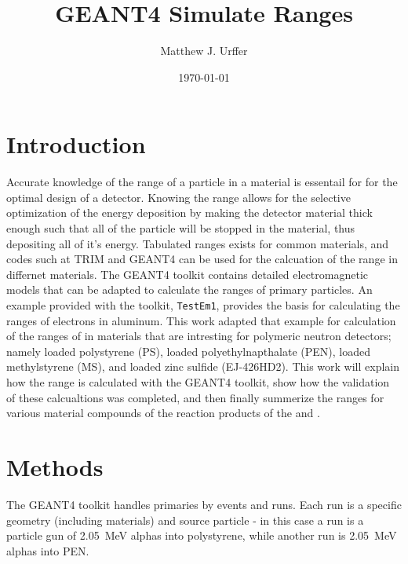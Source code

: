 \documentclass[draftcls,onecolumn]{IEEEtran}
\begin{document}
\title{GEANT4 Simulate Ranges}
\author{Matthew J. Urffer}
\date{\today}
\maketitle

\printnomenclature

\listoftodos
\tableofcontents
\listoffigures
\listoftables
\lstlistoflistings

\section{Introduction}
Accurate knowledge of the range of a particle in a material is essentail for for the optimal design of a detector.
Knowing the range allows for the selective optimization of the energy deposition by making the detector material thick enough such that all of the particle will be stopped in the material, thus depositing all of it's energy.
Tabulated ranges exists for common materials, and codes such at TRIM and GEANT4 can be used for the calcuation of the range in differnet materials\cite{berger_estar_2005}.
The GEANT4 toolkit contains detailed electromagnetic models that can be adapted to calculate the ranges of primary particles.
An example provided with the toolkit, \verb+TestEm1+, provides the basis for calculating the ranges of electrons in aluminum. 
This work adapted that example for calculation of the ranges of in materials that are intresting for polymeric neutron detectors; namely  loaded polystyrene (PS),  loaded polyethylnapthalate (PEN),  loaded methylstyrene (MS), and  loaded zinc sulfide (EJ-426HD2).
This work will explain how the range is calculated with the GEANT4 toolkit, show how the validation of these calcualtions was completed, and then finally summerize the ranges for various material compounds of the reaction products of the  and .

\section{Methods}
\label{sec:Methods}

The GEANT4 toolkit handles primaries by events and runs. 
Each run is a specific geometry (including materials) and source particle - in this case a run is a particle gun of \SI{2.05}{\MeV} alphas into polystyrene, while another run is \SI{2.05}{\MeV} alphas into PEN.
\end{document}
